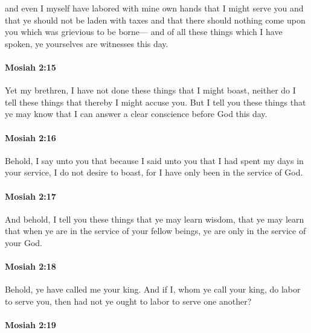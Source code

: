 			and even I myself have labored with mine own hands that I might serve you
			and that ye should not be laden with taxes
			and that there should nothing come upon you which was grievious to be borne---
			and of all these things which I have spoken,
			ye yourselves are witnesses this day.
			
		\paragraph{Mosiah 2:15} %
			\label{MOSIAH-2-15}
			
			Yet my brethren, I have not done these things that I might boast,
			neither do I tell these things that thereby I might accuse you.
			But I tell you these things that ye may know
			that I can answer a clear conscience before God this day.
			
		\paragraph{Mosiah 2:16} %
			\label{MOSIAH-2-16}
			
			Behold, I say unto you that
			because I said unto you that I had spent my days in your service,
			I do not desire to boast,
			for I have only been in the service of God.
			
		\paragraph{Mosiah 2:17} %
			\label{MOSIAH-2-17}
			
			And behold, I tell you these things that ye may learn wisdom,
			that ye may learn that when ye are in the service of your fellow beings,
			ye are only in the service of your God.
			
		\paragraph{Mosiah 2:18} %
			\label{MOSIAH-2-18}
			
			Behold, ye have called me your king.
			And if I, whom ye call your king, do labor to serve you,
			then had not ye ought to labor to serve one another?
			
		\paragraph{Mosiah 2:19} %
			\label{MOSIAH-2-19}
			
